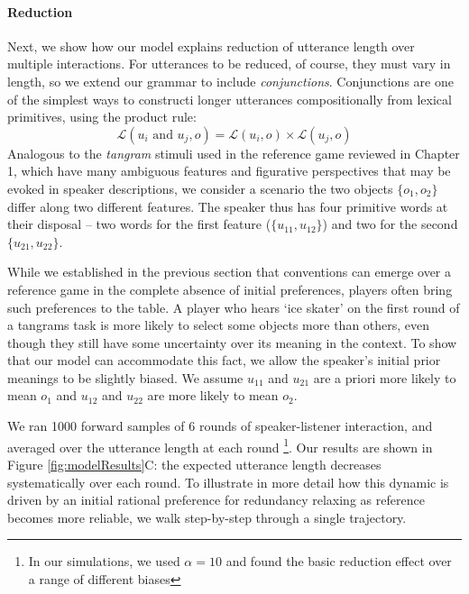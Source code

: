 \paragraph{Reduction}
Next, we show how our model explains reduction of utterance length over multiple interactions. 
For utterances to be reduced, of course, they must vary in length, so we extend our grammar to include \emph{conjunctions}. 
Conjunctions are one of the simplest ways to constructi longer utterances compositionally from lexical primitives, using the product rule:
$$\mathcal{L}(u_i \textrm{ and } u_j, o) = \mathcal{L}(u_i, o) \times \mathcal{L}(u_j, o)$$
\indent Analogous to the \emph{tangram} stimuli used in the reference game reviewed in Chapter 1, which have many ambiguous features and figurative perspectives that may be evoked in speaker descriptions, we consider a scenario the two objects $\{o_1, o_2\}$ differ along two different features. 
The speaker thus has four primitive words at their disposal -- two words for the first feature ($\{u_{11}, u_{12}\}$) and two for the second $\{u_{21}, u_{22}\}$. 

While we established in the previous section that conventions can emerge over a reference game in the complete absence of initial preferences, players often bring such preferences to the table. 
A player who hears `ice skater' on the first round of a tangrams task is more likely to select some objects more than others, even though they still have some uncertainty over its meaning in the context. 
To show that our model can accommodate this fact, we allow the speaker's initial prior meanings to be slightly biased. 
We assume $u_{11}$ and $u_{21}$ are a priori more likely to mean $o_1$ and $u_{12}$ and $u_{22}$ are more likely to mean $o_2$.

We ran 1000 forward samples of 6 rounds of speaker-listener interaction, and averaged over the utterance length at each round \footnote{In our simulations, we used $\alpha = 10$ and found the basic reduction effect over a range of different biases}. 
Our results are shown in Figure \ref{fig:modelResults}C: the expected utterance length decreases systematically over each round. 
To illustrate in more detail how this dynamic is driven by an initial rational preference for redundancy relaxing as reference becomes more reliable, we walk step-by-step through a single trajectory. 

